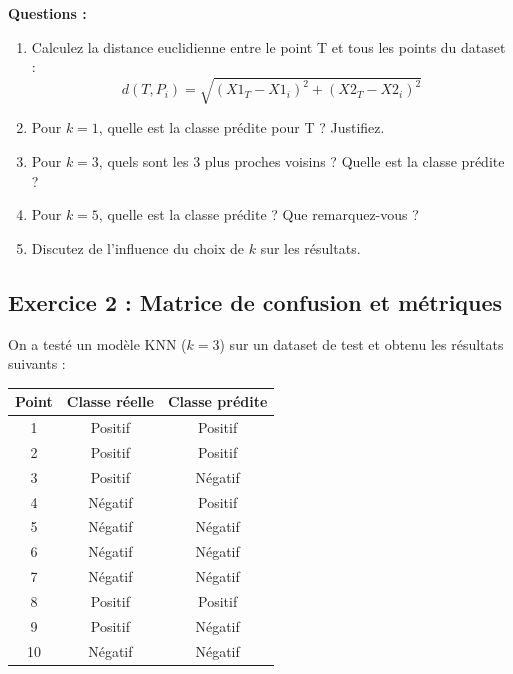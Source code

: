 \documentclass[11pt,a4paper]{article}
\begin{document}
\begin{questionbox}
\textbf{Questions :}
\begin{enumerate}
    \item Calculez la distance euclidienne entre le point T et tous les points du dataset :
    $$d(T, P_i) = \sqrt{(X1_T - X1_i)^2 + (X2_T - X2_i)^2}$$
    
    \item Pour $k=1$, quelle est la classe prédite pour T ? Justifiez.
    
    \item Pour $k=3$, quels sont les 3 plus proches voisins ? Quelle est la classe prédite ?
    
    \item Pour $k=5$, quelle est la classe prédite ? Que remarquez-vous ?
    
    \item Discutez de l'influence du choix de $k$ sur les résultats.
\end{enumerate}
\end{questionbox}

\subsection{Exercice 2 : Matrice de confusion et métriques}

\begin{databox}
On a testé un modèle KNN ($k=3$) sur un dataset de test et obtenu les résultats suivants :

\begin{center}
\begin{tabular}{|c|c|c|}
\hline
\textbf{Point} & \textbf{Classe réelle} & \textbf{Classe prédite} \\
\hline
1 & Positif & Positif \\
2 & Positif & Positif \\
3 & Positif & Négatif \\
4 & Négatif & Positif \\
5 & Négatif & Négatif \\
6 & Négatif & Négatif \\
7 & Négatif & Négatif \\
8 & Positif & Positif \\
9 & Positif & Négatif \\
10 & Négatif & Négatif \\
\hline
\end{tabular}
\end{center}
\end{databox}
\end{document}
